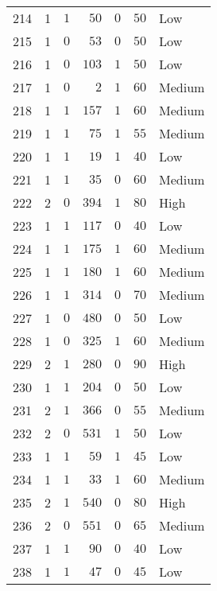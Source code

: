 \begin{table}[!tbp]
\begin{center}
\begin{tabular}{llrrrrl}
214&1&$1$&$  50$&$0$&$ 50$&Low\tabularnewline
215&1&$0$&$  53$&$0$&$ 50$&Low\tabularnewline
216&1&$0$&$ 103$&$1$&$ 50$&Low\tabularnewline
217&1&$0$&$   2$&$1$&$ 60$&Medium\tabularnewline
218&1&$1$&$ 157$&$1$&$ 60$&Medium\tabularnewline
219&1&$1$&$  75$&$1$&$ 55$&Medium\tabularnewline
220&1&$1$&$  19$&$1$&$ 40$&Low\tabularnewline
221&1&$1$&$  35$&$0$&$ 60$&Medium\tabularnewline
222&2&$0$&$ 394$&$1$&$ 80$&High\tabularnewline
223&1&$1$&$ 117$&$0$&$ 40$&Low\tabularnewline
224&1&$1$&$ 175$&$1$&$ 60$&Medium\tabularnewline
225&1&$1$&$ 180$&$1$&$ 60$&Medium\tabularnewline
226&1&$1$&$ 314$&$0$&$ 70$&Medium\tabularnewline
227&1&$0$&$ 480$&$0$&$ 50$&Low\tabularnewline
228&1&$0$&$ 325$&$1$&$ 60$&Medium\tabularnewline
229&2&$1$&$ 280$&$0$&$ 90$&High\tabularnewline
230&1&$1$&$ 204$&$0$&$ 50$&Low\tabularnewline
231&2&$1$&$ 366$&$0$&$ 55$&Medium\tabularnewline
232&2&$0$&$ 531$&$1$&$ 50$&Low\tabularnewline
233&1&$1$&$  59$&$1$&$ 45$&Low\tabularnewline
234&1&$1$&$  33$&$1$&$ 60$&Medium\tabularnewline
235&2&$1$&$ 540$&$0$&$ 80$&High\tabularnewline
236&2&$0$&$ 551$&$0$&$ 65$&Medium\tabularnewline
237&1&$1$&$  90$&$0$&$ 40$&Low\tabularnewline
238&1&$1$&$  47$&$0$&$ 45$&Low\tabularnewline
\hline
\end{tabular}\end{center}
\end{table}
